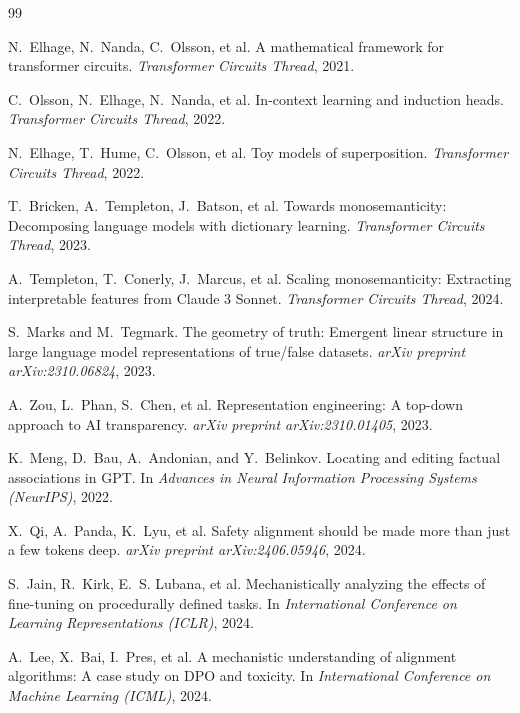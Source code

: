 \documentclass[11pt]{article}
\begin{document}

\begin{thebibliography}{99}

N.~Elhage, N.~Nanda, C.~Olsson, et al.
\newblock A mathematical framework for transformer circuits.
\newblock \emph{Transformer Circuits Thread}, 2021.

C.~Olsson, N.~Elhage, N.~Nanda, et al.
\newblock In-context learning and induction heads.
\newblock \emph{Transformer Circuits Thread}, 2022.

N.~Elhage, T.~Hume, C.~Olsson, et al.
\newblock Toy models of superposition.
\newblock \emph{Transformer Circuits Thread}, 2022.

T.~Bricken, A.~Templeton, J.~Batson, et al.
\newblock Towards monosemanticity: Decomposing language models with dictionary
learning.
\newblock \emph{Transformer Circuits Thread}, 2023.

A.~Templeton, T.~Conerly, J.~Marcus, et al.
\newblock Scaling monosemanticity: Extracting interpretable features from Claude
3 Sonnet.
\newblock \emph{Transformer Circuits Thread}, 2024.

S.~Marks and M.~Tegmark.
\newblock The geometry of truth: Emergent linear structure in large language
model representations of true/false datasets.
\newblock \emph{arXiv preprint arXiv:2310.06824}, 2023.

A.~Zou, L.~Phan, S.~Chen, et al.
\newblock Representation engineering: A top-down approach to AI transparency.
\newblock \emph{arXiv preprint arXiv:2310.01405}, 2023.

K.~Meng, D.~Bau, A.~Andonian, and Y.~Belinkov.
\newblock Locating and editing factual associations in GPT.
\newblock In \emph{Advances in Neural Information Processing Systems (NeurIPS)},
2022.

X.~Qi, A.~Panda, K.~Lyu, et al.
\newblock Safety alignment should be made more than just a few tokens deep.
\newblock \emph{arXiv preprint arXiv:2406.05946}, 2024.

S.~Jain, R.~Kirk, E.~S. Lubana, et al.
\newblock Mechanistically analyzing the effects of fine-tuning on procedurally
defined tasks.
\newblock In \emph{International Conference on Learning Representations (ICLR)},
2024.

A.~Lee, X.~Bai, I.~Pres, et al.
\newblock A mechanistic understanding of alignment algorithms: A case study on
DPO and toxicity.
\newblock In \emph{International Conference on Machine Learning (ICML)}, 2024.


\end{thebibliography}
\end{document}

